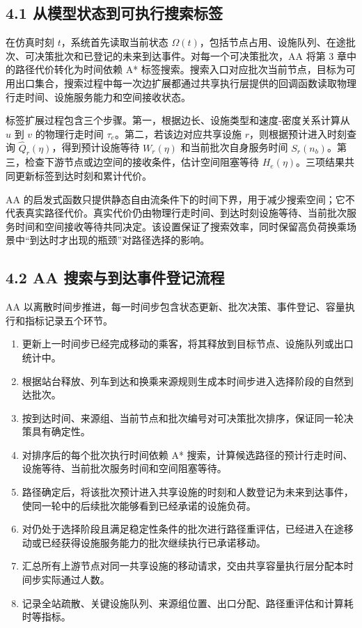 \documentclass[UTF8,a4paper,12pt]{ctexart}
\begin{document}
\subsection{4.1 从模型状态到可执行搜索标签}

在仿真时刻 \(t\)，系统首先读取当前状态 \(\Omega(t)\)，包括节点占用、设施队列、在途批次、可决策批次和已登记的未来到达事件。对每一个可决策批次，AA 将第 3 章中的路径代价转化为时间依赖 A* 标签搜索。搜索入口对应批次当前节点，目标为可用出口集合，搜索过程中每一次边扩展都通过共享执行层提供的回调函数读取物理行走时间、设施服务能力和空间接收状态。

标签扩展过程包含三个步骤。第一，根据边长、设施类型和速度-密度关系计算从 \(u\) 到 \(v\) 的物理行走时间 \(\tau_e\)。第二，若该边对应共享设施 \(r\)，则根据预计进入时刻查询 \(\widehat Q_r(\eta)\)，得到预计设施等待 \(W_r(\eta)\) 和当前批次自身服务时间 \(S_r(n_b)\)。第三，检查下游节点或边空间的接收条件，估计空间阻塞等待 \(H_e(\eta)\)。三项结果共同更新标签到达时刻和累计代价。

AA 的启发式函数只提供静态自由流条件下的时间下界，用于减少搜索空间；它不代表真实路径代价。真实代价仍由物理行走时间、到达时刻设施等待、当前批次服务时间和空间接收等待共同决定。该设置保证了搜索效率，同时保留高负荷换乘场景中“到达时才出现的瓶颈”对路径选择的影响。

\subsection{4.2 AA 搜索与到达事件登记流程}

AA 以离散时间步推进，每一时间步包含状态更新、批次决策、事件登记、容量执行和指标记录五个环节。

\begin{enumerate}
    \item 更新上一时间步已经完成移动的乘客，将其释放到目标节点、设施队列或出口统计中。
    \item 根据站台释放、列车到达和换乘来源规则生成本时间步进入选择阶段的自然到达批次。
    \item 按到达时间、来源组、当前节点和批次编号对可决策批次排序，保证同一轮决策具有确定性。
    \item 对排序后的每个批次执行时间依赖 A* 搜索，计算候选路径的预计行走时间、设施等待、当前批次服务时间和空间阻塞等待。
    \item 路径确定后，将该批次预计进入共享设施的时刻和人数登记为未来到达事件，使同一轮中的后续批次能够看到已经承诺的设施负荷。
    \item 对仍处于选择阶段且满足稳定性条件的批次进行路径重评估，已经进入在途移动或已经获得设施服务能力的批次继续执行已承诺移动。
    \item 汇总所有上游节点对同一共享设施的移动请求，交由共享容量执行层分配本时间步实际通过人数。
    \item 记录全站疏散、关键设施队列、来源组位置、出口分配、路径重评估和计算耗时等指标。
\end{enumerate}
\end{document}
